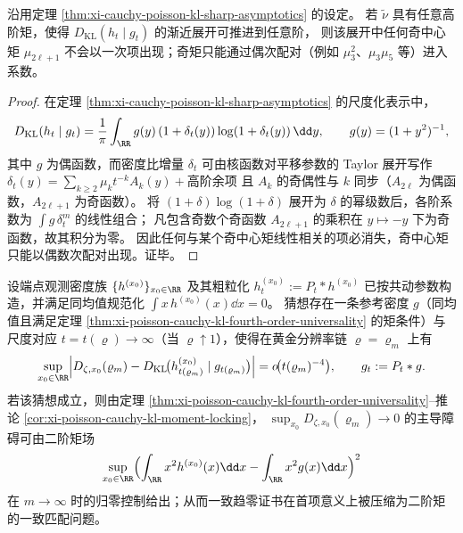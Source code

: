 \begin{proposition}[奇中心矩的配对选择律]\label{prop:xi-cauchy-poisson-odd-moment-selection-law}
沿用定理 \ref{thm:xi-cauchy-poisson-kl-sharp-asymptotics} 的设定。
若 \(\tilde\nu\) 具有任意高阶矩，使得 \(D_{\mathrm{KL}}(h_t\mid g_t)\) 的渐近展开可推进到任意阶，
则该展开中任何奇中心矩 \(\mu_{2\ell+1}\) 不会以一次项出现；奇矩只能通过偶次配对（例如 \(\mu_3^2\)、\(\mu_3\mu_5\) 等）进入系数。
\end{proposition}
\begin{proof}
在定理 \ref{thm:xi-cauchy-poisson-kl-sharp-asymptotics} 的尺度化表示中，
\[
D_{\mathrm{KL}}(h_t\mid g_t)
=\frac{1}{\pi}\int_{\RR} g(y)\,(1+\delta_t(y))\log(1+\delta_t(y))\,\dd y,
\qquad g(y)=(1+y^2)^{-1},
\]
其中 \(g\) 为偶函数，而密度比增量 \(\delta_t\) 可由核函数对平移参数的 Taylor 展开写作
\(
\delta_t(y)=\sum_{k\ge 2}\mu_k t^{-k}A_k(y)+\text{高阶余项}
\)
且 \(A_k\) 的奇偶性与 \(k\) 同步（\(A_{2\ell}\) 为偶函数，\(A_{2\ell+1}\) 为奇函数）。
将 \((1+\delta)\log(1+\delta)\) 展开为 \(\delta\) 的幂级数后，各阶系数为 \(\int g\,\delta_t^m\) 的线性组合；
凡包含奇数个奇函数 \(A_{2\ell+1}\) 的乘积在 \(y\mapsto -y\) 下为奇函数，故其积分为零。
因此任何与某个奇中心矩线性相关的项必消失，奇中心矩只能以偶数次配对出现。证毕。
\end{proof}

\begin{conjecture}\label{conj:xi-comoving-defect-second-moment-dominance}
设端点观测密度族 \(\{h^{(x_0)}\}_{x_0\in\RR}\) 及其粗粒化 \(h_t^{(x_0)}:=P_t*h^{(x_0)}\) 已按共动参数构造，并满足同均值规范化 \(\int x\,h^{(x_0)}(x)\dd x=0\)。
猜想存在一条参考密度 \(g\)（同均值且满足定理 \ref{thm:xi-poisson-cauchy-kl-fourth-order-universality} 的矩条件）与尺度对应 \(t=t(\varrho)\to\infty\)（当 \(\varrho\uparrow 1\)），使得在黄金分辨率链 \(\varrho=\varrho_m\) 上有
\[
\sup_{x_0\in\RR}
\Bigl|
D_{\zeta,x_0}(\varrho_m)-D_{\mathrm{KL}}\!\bigl(h^{(x_0)}_{t(\varrho_m)}\mid g_{t(\varrho_m)}\bigr)
\Bigr|
=o\!\bigl(t(\varrho_m)^{-4}\bigr),
\qquad
g_t:=P_t*g.
\]
若该猜想成立，则由定理 \ref{thm:xi-poisson-cauchy-kl-fourth-order-universality}--推论 \ref{cor:xi-poisson-cauchy-kl-moment-locking}，
\(\sup_{x_0}D_{\zeta,x_0}(\varrho_m)\to 0\) 的主导障碍可由二阶矩场
\[
\sup_{x_0\in\RR}\Bigl(\int_{\RR}x^2h^{(x_0)}(x)\dd x-\int_{\RR}x^2g(x)\dd x\Bigr)^2
\]
在 \(m\to\infty\) 时的归零控制给出；从而一致趋零证书在首项意义上被压缩为二阶矩的一致匹配问题。
\end{conjecture}

\endinput
